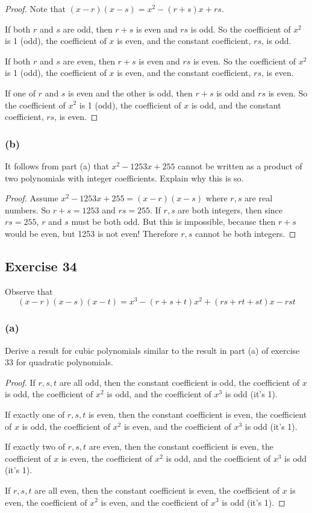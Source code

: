\documentclass[14pt]{extarticle}
\begin{document}
\begin{proof}
Note that $(x - r)(x - s) = x^2 - (r + s)x + rs$. 

If both $r$ and $s$ are odd, then $r + s$ is even and $rs$ is odd. So the coefficient of $x^2$ is 1 (odd), the coefficient of $x$ is even, and the constant coefficient, $rs$, is odd.

If both $r$ and $s$ are even, then $r + s$ is even and $rs$ is even. So the coefficient of $x^2$ is 1 (odd), the coefficient of $x$ is even, and the constant coefficient, $rs$, is even.

If one of $r$ and $s$ is even and the other is odd, then $r + s$ is odd and $rs$ is even. So the coefficient of $x^2$ is 1 (odd), the coefficient of $x$ is odd, and the constant coefficient, $rs$, is even.
\end{proof}

\subsubsection{(b)}
It follows from part (a) that $x^2 - 1253x + 255$ cannot be written as a product of two polynomials with integer coefficients. Explain why this is so.

\begin{proof}
Assume $x^2 - 1253x + 255 = (x-r)(x-s)$ where $r,s$ are real numbers. So $r+s = 1253$ and $rs = 255$. If $r,s$ are both integers, then since $rs = 255$, $r$ and $s$ must be both odd. But this is impossible, because then $r+s$ would be even, but 1253 is not even! Therefore $r,s$ cannot be both integers.
\end{proof}

\subsection{Exercise 34}
Observe that
\[
(x-r)(x-s)(x-t) = x^3 - (r+s+t)x^2 + (rs+rt+st)x - rst
\]
\subsubsection{(a)}
Derive a result for cubic polynomials similar to the result in part (a) of exercise 33 for quadratic polynomials.

\begin{proof}
If $r,s,t$ are all odd, then the constant coefficient is odd, the coefficient of $x$ is odd, the coefficient of $x^2$ is odd, and the coefficient of $x^3$ is odd (it's 1).

If exactly one of $r,s,t$ is even, then the constant coefficient is even, the coefficient of $x$ is odd, the coefficient of $x^2$ is even, and the coefficient of $x^3$ is odd (it's 1).

If exactly two of $r,s,t$ are even, then the constant coefficient is even, the coefficient of $x$ is even, the coefficient of $x^2$ is odd, and the coefficient of $x^3$ is odd (it's 1).

If $r,s,t$ are all even, then the constant coefficient is even, the coefficient of $x$ is even, the coefficient of $x^2$ is even, and the coefficient of $x^3$ is odd (it's 1).
\end{proof}
\end{document}
